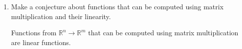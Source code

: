 \documentclass[letter]{article}
\newcommand{\R}{\mathbb{R}}
\newcommand{\mat}[1]{\begin{bmatrix}#1\end{bmatrix}}
\newenvironment{answer}{
	\begin{adjustwidth}{8mm}{} \vspace{2mm}}{\end{adjustwidth} \vspace{2mm}
}
\theoremstyle{plain}
\theoremstyle{definition}
\theoremstyle{remark}
\begin{document}
\begin{enumerate}
\begin{enumerate}
\begin{answer}
\begin{proof}
\begin{enumerate}
						\item[(ii)] $\displaystyle M(\vec{v} + \vec{w}) = \left[\begin{array}{cc}									a & b\\
						c & d
						\end{array}\right] = 
						\mat{a(v_1 + w_1) + b(v_2 + w_2) \\ c(v_1 + w_1) + d(v_2 + w_2)} = \mat{av_1 + bv_2\\cv_1 + dv_2} + \mat{aw_1 + bw_2\\cw_1 + dw_2} = M\vec{v} + M\vec{w}$. 
					\end{enumerate}
					Therefore, $f_M$ is linear. 
					\end{proof}
				\end{answer}
				\item Make a conjecture about functions that can be computed using matrix
					multiplication and their linearity.
				\begin{answer}
					Functions from $\R^n \to \R^m$ that can be computed using matrix multiplication are linear functions. 
				\end{answer}
			\end{enumerate}
	\end{enumerate}
\end{document}
